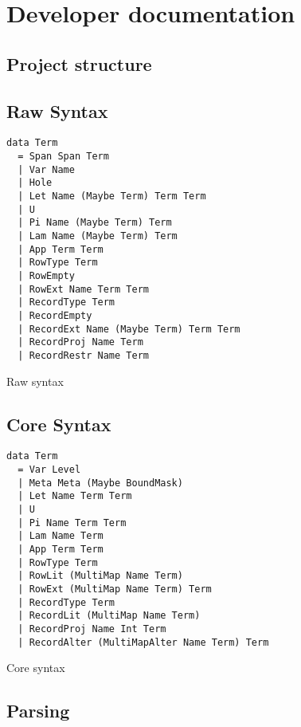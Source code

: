 \chapter{Developer documentation}\label{ch:devdocs}

\section{Project structure}



\section{Raw Syntax}

\begin{listing}
  \begin{verbatim}
data Term
  = Span Span Term
  | Var Name
  | Hole
  | Let Name (Maybe Term) Term Term
  | U
  | Pi Name (Maybe Term) Term
  | Lam Name (Maybe Term) Term
  | App Term Term
  | RowType Term
  | RowEmpty
  | RowExt Name Term Term
  | RecordType Term
  | RecordEmpty
  | RecordExt Name (Maybe Term) Term Term
  | RecordProj Name Term
  | RecordRestr Name Term
  \end{verbatim}
  \caption{Raw syntax }\label{lst:raw-adt}
\end{listing}

\section{Core Syntax}

\begin{listing}
  \begin{verbatim}
data Term
  = Var Level
  | Meta Meta (Maybe BoundMask)
  | Let Name Term Term
  | U
  | Pi Name Term Term
  | Lam Name Term
  | App Term Term
  | RowType Term
  | RowLit (MultiMap Name Term)
  | RowExt (MultiMap Name Term) Term
  | RecordType Term
  | RecordLit (MultiMap Name Term)
  | RecordProj Name Int Term
  | RecordAlter (MultiMapAlter Name Term) Term
  \end{verbatim}
  \caption{Core syntax }\label{lst:core-adt}
\end{listing}

\section{Parsing}

